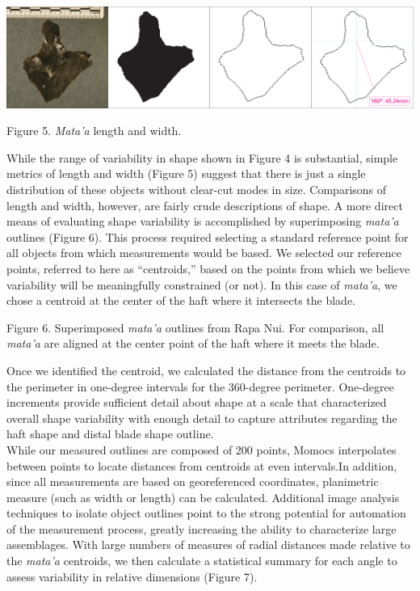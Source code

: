\documentclass[]{article}
\begin{document}
\includegraphics{../Figures/Figure3.jpg}

 Figure 5. \emph{Mata'a} length and width.

While the range of variability in shape shown in Figure 4 is
substantial, simple metrics of length and width (Figure 5) suggest that
there is just a single distribution of these objects without clear-cut
modes in size. Comparisons of length and width, however, are fairly
crude descriptions of shape. A more direct means of evaluating shape
variability is accomplished by superimposing \emph{mata'a} outlines
(Figure 6). This process required selecting a standard reference point
for all objects from which measurements would be based. We selected our
reference points, referred to here as ``centroids,'' based on the points
from which we believe variability will be meaningfully constrained (or
not). In this case of \emph{mata'a}, we chose a centroid at the center
of the haft where it intersects the blade.

 Figure 6. Superimposed \emph{mata'a} outlines from Rapa Nui. For
comparison, all \emph{mata'a} are aligned at the center point of the
haft where it meets the blade.

Once we identified the centroid, we calculated the distance from the
centroids to the perimeter in one-degree intervals for the 360-degree
perimeter. One-degree increments provide sufficient detail about shape
at a scale that characterized overall shape variability with enough
detail to capture attributes regarding the haft shape and distal blade
shape outline.\\While our measured outlines are composed of 200 points,
Momocs interpolates between points to locate distances from centroids at
even intervals.In addition, since all measurements are based on
georeferenced coordinates, planimetric measure (such as width or length)
can be calculated. Additional image analysis techniques to isolate
object outlines point to the strong potential for automation of the
measurement process, greatly increasing the ability to characterize
large assemblages. With large numbers of measures of radial distances
made relative to the \emph{mata'a} centroids, we then calculate a
statistical summary for each angle to assess variability in relative
dimensions (Figure 7).
\end{document}

